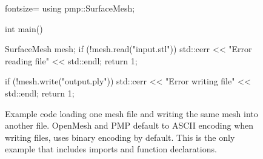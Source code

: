 \begin{figure}[p]
\begin{minipage}{.9\textwidth}
\begin{cppcode*}{fontsize=\footnotesize}
      using pmp::SurfaceMesh;

      int main() {
          SurfaceMesh mesh;
          if (!mesh.read("input.stl")) {
              std::cerr << "Error reading file" << std::endl;
              return 1;
          }

          if (!mesh.write("output.ply")) {
              std::cerr << "Error writing file" << std::endl;
              return 1;
          }
      }
    \end{cppcode*}
  \end{minipage}

  \caption{
    Example code loading one mesh file and writing the same mesh into another file.
    OpenMesh and PMP default to ASCII encoding when writing files,  uses binary encoding by default.
    This is the only example that includes imports and function declarations.
  }
  \label{fig:example-io}
\end{figure}

